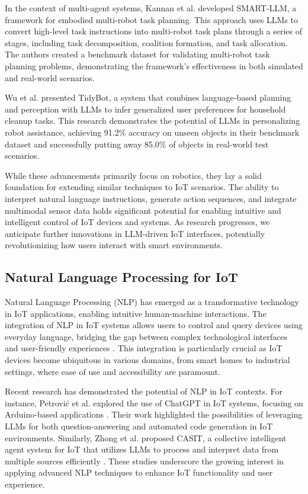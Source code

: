 \documentclass{ieeeaccess}
\begin{document}
In the context of multi-agent systems, Kannan et al. \cite{kannan2024smartllmsmartmultiagentrobot} developed SMART-LLM, a framework for embodied multi-robot task planning. This approach uses LLMs to convert high-level task instructions into multi-robot task plans through a series of stages, including task decomposition, coalition formation, and task allocation. The authors created a benchmark dataset for validating multi-robot task planning problems, demonstrating the framework's effectiveness in both simulated and real-world scenarios.

Wu et al. \cite{Wu2023} presented TidyBot, a system that combines language-based planning and perception with LLMs to infer generalized user preferences for household cleanup tasks. This research demonstrates the potential of LLMs in personalizing robot assistance, achieving 91.2\% accuracy on unseen objects in their benchmark dataset and successfully putting away 85.0\% of objects in real-world test scenarios.

While these advancements primarily focus on robotics, they lay a solid foundation for extending similar techniques to IoT scenarios. The ability to interpret natural language instructions, generate action sequences, and integrate multimodal sensor data holds significant potential for enabling intuitive and intelligent control of IoT devices and systems. As research progresses, we anticipate further innovations in LLM-driven IoT interfaces, potentially revolutionizing how users interact with smart environments.

\subsection{Natural Language Processing for IoT}
Natural Language Processing (NLP) has emerged as a transformative technology in IoT applications, enabling intuitive human-machine interactions. The integration of NLP in IoT systems allows users to control and query devices using everyday language, bridging the gap between complex technological interfaces and user-friendly experiences \cite{10.1145/3643505}. This integration is particularly crucial as IoT devices become ubiquitous in various domains, from smart homes to industrial settings, where ease of use and accessibility are paramount.

Recent research has demonstrated the potential of NLP in IoT contexts. For instance, Petrović et al. explored the use of ChatGPT in IoT systems, focusing on Arduino-based applications \cite{10315791}. Their work highlighted the possibilities of leveraging LLMs for both question-answering and automated code generation in IoT environments. Similarly, Zhong et al. proposed CASIT, a collective intelligent agent system for IoT that utilizes LLMs to process and interpret data from multiple sources efficiently \cite{10439991}. These studies underscore the growing interest in applying advanced NLP techniques to enhance IoT functionality and user experience.
\end{document}
